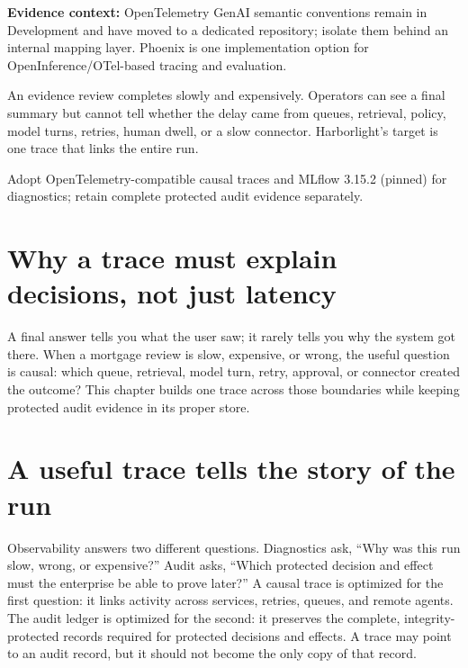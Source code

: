 

\begin{bookquote}

\textbf{Evidence context:} OpenTelemetry GenAI semantic conventions remain in Development and have moved to a dedicated repository; isolate them behind an internal mapping layer. Phoenix is one implementation option for OpenInference/OTel-based tracing and evaluation. \textbf{}

\end{bookquote}

\begin{bookcallout}
An evidence review completes slowly and expensively. Operators can see a final summary but cannot tell whether the delay came from queues, retrieval, policy, model turns, retries, human dwell, or a slow connector. Harborlight's target is one trace that links the entire run.
\end{bookcallout}

\begin{bookcallout}
Adopt OpenTelemetry-compatible causal traces and MLflow 3.15.2 (pinned) for diagnostics; retain complete protected audit evidence separately.
\end{bookcallout}

\section{Why a trace must explain decisions, not just latency}

A final answer tells you what the user saw; it rarely tells you why the system got there. When a mortgage review is slow, expensive, or wrong, the useful question is causal: which queue, retrieval, model turn, retry, approval, or connector created the outcome? This chapter builds one trace across those boundaries while keeping protected audit evidence in its proper store.\par

\section{A useful trace tells the story of the run}

Observability answers two different questions. Diagnostics ask, “Why was this run slow, wrong, or expensive?” Audit asks, “Which protected decision and effect must the enterprise be able to prove later?” A causal trace is optimized for the first question: it links activity across services, retries, queues, and remote agents. The audit ledger is optimized for the second: it preserves the complete, integrity-protected records required for protected decisions and effects. A trace may point to an audit record, but it should not become the only copy of that record.\par

